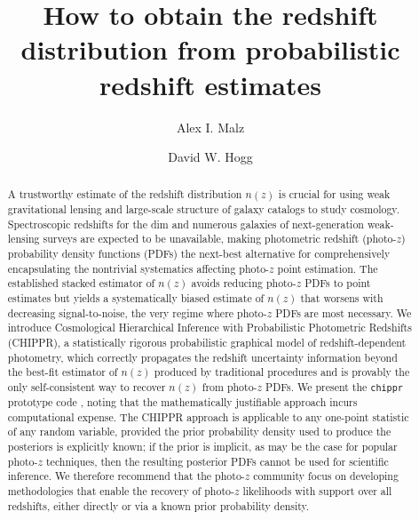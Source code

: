 \documentclass[iop]{emulateapj}
\begin{document}

\title{How to obtain the redshift distribution from probabilistic redshift estimates}

\author{Alex I. Malz}
\author{David W. Hogg}


\begin{abstract}
A trustworthy estimate of the redshift distribution $n(z)$ is crucial for using weak gravitational lensing and large-scale structure of galaxy catalogs to study cosmology.
Spectroscopic redshifts for the dim and numerous galaxies of next-generation weak-lensing surveys are expected to be unavailable, making photometric redshift (photo-$z$) probability density functions (PDFs) the next-best alternative for comprehensively encapsulating the nontrivial systematics affecting photo-$z$ point estimation.
The established stacked estimator of $n(z)$ avoids reducing photo-$z$ PDFs to point estimates but yields a systematically biased estimate of $n(z)$ that worsens with decreasing signal-to-noise, the very regime where photo-$z$ PDFs are most necessary.
We introduce Cosmological Hierarchical Inference with Probabilistic Photometric Redshifts (\textsc{CHIPPR}), a statistically rigorous probabilistic graphical model of redshift-dependent photometry, which correctly propagates the redshift uncertainty information beyond the best-fit estimator of $n(z)$ produced by traditional procedures and is provably the only self-consistent way to recover $n(z)$ from photo-$z$ PDFs.
We present the \texttt{chippr} prototype code
, noting that the mathematically justifiable approach incurs computational expense.
The \textsc{CHIPPR} approach is applicable to any one-point statistic of any random variable, provided the prior probability density used to produce the posteriors is explicitly known;
if the prior is implicit, as may be the case for popular photo-$z$ techniques, then the resulting posterior PDFs cannot be used for scientific inference.
We therefore recommend that the photo-$z$ community focus on developing methodologies that enable the recovery of photo-$z$ likelihoods with support over all redshifts, either directly or via a known prior probability density.
\end{abstract}
\end{document}
